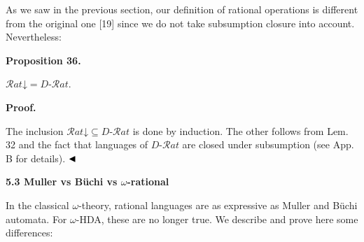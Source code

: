 \documentclass[10pt,a4paper]{article}
\begin{document}
 
  
 
 
 
As we saw in the previous section, our definition of rational operations is different from the original one [19] since we do not take subsumption closure into account. Nevertheless:\par
 
 
 
\par\medskip\noindent\textbf{Proposition 36.}\par
 
 
$\mathcal{R}at\mathord{\downarrow}=D\text{-}\mathcal{R}at$.\par
 
 
 
 
 
\par\medskip\noindent\textbf{Proof.}\par
 
 
The inclusion $\mathcal{R}at\mathord{\downarrow}\subseteq D\text{-}\mathcal{R}at$ is done by induction. The other follows from Lem. 32 and the fact that languages of $D\text{-}\mathcal{R}at$ are closed under subsumption (see App. B for details). $\hfill\blacktriangleleft$\par
 
 
 
 
 
\par\medskip\noindent\textbf{5.3 Muller vs Büchi vs $\omega$-rational}\par
 
 
In the classical $\omega$-theory, rational languages are as expressive as Muller and Büchi automata. For $\omega$-HDA, these are no longer true. We describe and prove here some differences:\par
 
\end{document}
